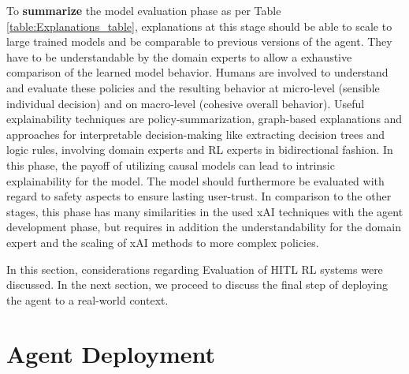 \documentclass[twoside,11pt]{article}
\begin{document}
\begin{enumerate}
\noindent To \textbf{summarize} the model evaluation phase as per Table \ref{table:Explanations_table}, explanations at this stage should be able to scale to large trained models and be comparable to previous versions of the agent. They have to be understandable by the domain experts to allow a exhaustive comparison of the learned model behavior. Humans are involved to understand and evaluate these policies and the resulting behavior at micro-level (sensible individual decision) and on macro-level (cohesive overall behavior). Useful explainability techniques are policy-summarization, graph-based explanations and approaches for interpretable decision-making like extracting decision trees and logic rules,  involving domain experts and RL experts in bidirectional fashion. In this phase, the payoff of utilizing causal models can lead to intrinsic explainability for the model. The model should furthermore be evaluated with regard to safety aspects to ensure lasting user-trust. In comparison to the other stages, this phase has many similarities in the used xAI techniques with the agent development phase, but requires in addition the understandability for the domain expert and the scaling of xAI methods to more complex policies.

In this section, considerations regarding Evaluation of HITL RL systems were discussed. In the next section, we proceed to discuss the final step of deploying the agent to a real-world context.

\section{Agent Deployment}
\label{sec:Deployment}


\end{enumerate}
\end{document}
